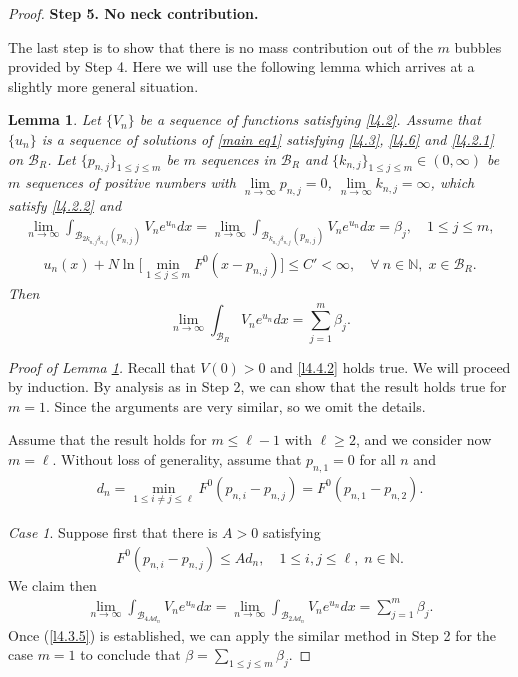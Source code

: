 \documentclass[11pt]{amsart}
\numberwithin{equation}{section}
\newtheorem{lem}[thm]{Lemma}
\newcommand{\N}{\mathbb{N}}
\begin{document}
\begin{proof}
\medskip
\textbf{Step 5. No neck contribution.}

The last step is to show that there is no mass contribution out of the $m$ bubbles provided by Step 4. Here we will use the following lemma  which arrives at a slightly more general situation.
\begin{lem}\label{lem3.2}
Let $\{V_n\}$  be a sequence of functions satisfying \eqref{l4.2}. Assume that $\{u_{n}\}$ is a sequence of solutions of \eqref{main eq1} satisfying \eqref{l4.3}, \eqref{l4.6} and \eqref{l4.2.1} on $\mathcal{B}_{R}$. Let $\{p_{n, j}\}_{1\le j \le m}$ be $m$ sequences in $\mathcal{B}_{R}$ and $\{k_{n, j}\}_{1\le j \le m} \in (0, \infty)$ be $m$ sequences of positive numbers with $\lim\limits_{n\rightarrow\infty}p_{n, j}=0$, $\lim\limits_{n\rightarrow\infty}k_{n, j}=\infty$, which satisfy \eqref{l4.2.2} and
\begin{align}\label{l4.2.4bis}
\lim_{n\rightarrow\infty}\int_{\mathcal{B}_{2k_{n, j}\delta_{n, j}}(p_{n, j})}V_{n}e^{u_{n}}dx=\lim_{n\rightarrow\infty}\int_{\mathcal{B}_{k_{n, j}\delta_{n, j}}(p_{n, j})}V_{n}e^{u_{n}}dx=\beta_j, \quad 1\leq j\leq m,
\end{align}
\begin{align}\label{l4.2.5bis}
u_{n}(x)+N\ln\Big[\min_{1\leq j\leq m}F^{0}(x-p_{n, j})\Big]\leq C' < \infty, \quad \forall ~n \in \N,\; x \in \mathcal{B}_R.
\end{align}
Then
 $$ \lim_{n\to\infty}\int_{\mathcal{B}_{R}}V_{n}e^{u_{n}}dx = \sum_{j=1}^{m}\beta_j.$$
\end{lem}

\noindent
{\sl Proof of Lemma \ref{lem3.2}.} Recall that $V(0)>0$ and \eqref{l4.4.2} holds true. We will proceed by induction. By analysis as in Step 2, we can show that the result holds true for $m=1$. Since the arguments are very similar, so we omit the details.

Assume that the result holds for $m \leq \ell-1$ with $\ell \ge 2$, and we consider now $m =\ell$. Without loss of generality, assume that $p_{n, 1} = 0$ for all $n$ and
\begin{align}
\label{dn}
d_{n}= \min_{1\leq i\ne j\leq \ell} F^{0}(p_{n,i}-p_{n, j}) = F^{0}(p_{n,1}-p_{n, 2}).
\end{align}

{\sl Case 1}. Suppose first that there is $A > 0$ satisfying
\begin{align}\label{l4.3.4}
F^{0}(p_{n,i}-p_{n, j})\leq Ad_{n}, \quad 1\leq i,j\leq \ell, \; n \in \N.
\end{align}
We claim then
\begin{align}\label{l4.3.5}
\lim\limits_{n\rightarrow\infty}\int_{\mathcal{B}_{4Ad_{n}}}V_{n}e^{u_{n}}dx=\lim\limits_{n\rightarrow\infty}\int_{\mathcal{B}_{2Ad_{n}}}V_{n}e^{u_{n}}dx=\sum_{j=1}^m \beta_j.
\end{align}
Once (\ref{l4.3.5}) is established, we can apply the similar method in Step 2 for the case $m=1$ to conclude that $\beta = \sum_{1\le j \le m} \beta_j.$


\end{proof}
\end{document}

